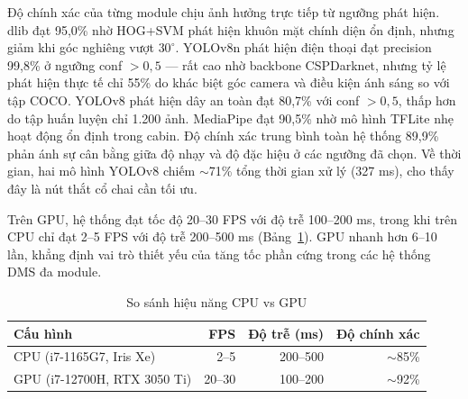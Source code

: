 Độ chính xác của từng module chịu ảnh hưởng trực tiếp từ ngưỡng phát hiện. dlib đạt 95,0\% nhờ HOG+SVM phát hiện khuôn mặt chính diện ổn định, nhưng giảm khi góc nghiêng vượt $30^\circ$. YOLOv8n phát hiện điện thoại đạt precision 99,8\% ở ngưỡng conf $>0,5$ — rất cao nhờ backbone CSPDarknet, nhưng tỷ lệ phát hiện thực tế chỉ 55\% do khác biệt góc camera và điều kiện ánh sáng so với tập COCO. YOLOv8 phát hiện dây an toàn đạt 80,7\% với conf $>0,5$, thấp hơn do tập huấn luyện chỉ 1.200 ảnh. MediaPipe đạt 90,5\% nhờ mô hình TFLite nhẹ hoạt động ổn định trong cabin. Độ chính xác trung bình toàn hệ thống 89,9\% phản ánh sự cân bằng giữa độ nhạy và độ đặc hiệu ở các ngưỡng đã chọn. Về thời gian, hai mô hình YOLOv8 chiếm $\sim$71\% tổng thời gian xử lý (327 ms), cho thấy đây là nút thắt cổ chai cần tối ưu.

\begin{table}[H]
\centering
\caption{Hiệu năng suy luận của các mô-đun trong hệ thống}
\fontsize{7}{8.5}\selectfont
\setlength{\tabcolsep}{2.5pt}
\label{tab:inference}
\end{table}

Trên GPU, hệ thống đạt tốc độ 20--30 FPS với độ trễ 100--200 ms, trong khi trên CPU chỉ đạt 2--5 FPS với độ trễ 200--500 ms (Bảng~\ref{tab:comparison}). GPU nhanh hơn 6--10 lần, khẳng định vai trò thiết yếu của tăng tốc phần cứng trong các hệ thống DMS đa module.

\begin{table}[H]
\centering
\caption{So sánh hiệu năng CPU vs GPU}
\fontsize{7}{8.5}\selectfont
\setlength{\tabcolsep}{2.5pt}
\begin{tabular}{lrrr}
\toprule
Cấu hình & FPS & Độ trễ (ms) & Độ chính xác \\
\midrule
CPU (i7-1165G7, Iris Xe) & 2--5 & 200--500 & $\sim$85\% \\
GPU (i7-12700H, RTX 3050 Ti) & 20--30 & 100--200 & $\sim$92\% \\
\bottomrule
\end{tabular}
\label{tab:comparison}
\end{table}
